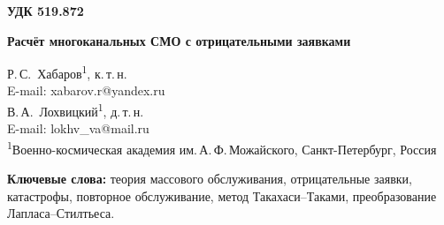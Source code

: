 \documentclass[a4paper,12pt]{article}
\begin{document}
\noindent\textbf{УДК 519.872}
\vspace{1em}

\begin{center}
{\Large\bfseries Расчёт многоканальных СМО с отрицательными заявками}
\end{center}
\vspace{0.8em}

\begin{center}
Р.\,С.~Хабаров\textsuperscript{1}, к.\,т.\,н.\\[2pt]
E-mail: xabarov.r@yandex.ru\\[6pt]
В.\,А.~Лохвицкий\textsuperscript{1}, д.\,т.\,н.\\[2pt]
E-mail: lokhv\_va@mail.ru\\[8pt]
{\small\textsuperscript{1}Военно-космическая академия им.\,А.\,Ф.\,Можайского, Санкт-Петербург, Россия}
\end{center}
\vspace{0.5em}

\begin{abstract}
Рассматривается расчёт многоканальных систем массового обслуживания с пуассоновскими потоками положительных и отрицательных заявок. Исследуются удаление одной обслуживаемой заявки и мгновенное очищение системы. Для двухфазного гиперэкспоненциального обслуживания описаны матрицы переходов и вычисление стационарных вероятностей методом Такахаси--Таками. Получены выражения для преобразований Лапласа--Стилтьеса времени ожидания, а для модели с очищением --- также времени пребывания. Для других распределений обслуживания используется согласование моментов; комплексные параметры рассматриваются как алгебраическая аппроксимация. Отдельно исследуются приближённые модели повторного обслуживания с новой и с сохранённой длительностью. Проведены проверки по уравнениям баланса, закону Литтла и имитационному моделированию. Указаны ограничения приближений и условия существования моментов.
\end{abstract}
\textbf{Ключевые слова:} теория массового обслуживания, отрицательные заявки, катастрофы, повторное обслуживание, метод Такахаси--Таками, преобразование Лапласа--Стилтьеса.
\end{document}
